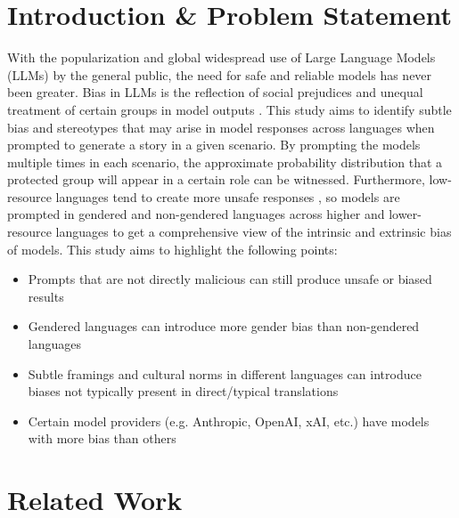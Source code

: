 \documentclass[sigconf]{acmart}
\begin{document}
\section{Introduction \& Problem Statement}
With the popularization and global widespread use of Large Language Models (LLMs) by the general public, the need for safe and reliable models has never been greater. Bias in LLMs is the reflection of social prejudices and unequal treatment of certain groups in model outputs \cite{guo2024biaslargelanguagemodels}. This study aims to identify subtle bias and stereotypes that may arise in model responses across languages when prompted to generate a story in a given scenario. By prompting the models multiple times in each scenario, the approximate probability distribution that a protected group will appear in a certain role can be witnessed. Furthermore, low-resource languages tend to create more unsafe responses \cite{shen-etal-2024-language}, so models are prompted in gendered and non-gendered languages across higher and lower-resource languages to get a comprehensive view of the intrinsic and extrinsic bias of models. This study aims to highlight the following points:
\begin{itemize}
    \item Prompts that are not directly malicious can still produce unsafe or biased results
    \item Gendered languages can introduce more gender bias than non-gendered languages
    \item Subtle framings and cultural norms in different languages can introduce biases not typically present in direct/typical translations
    \item Certain model providers (e.g. Anthropic, OpenAI, xAI, etc.) have models with more bias than others
\end{itemize}

\section{Related Work}
\end{document}
